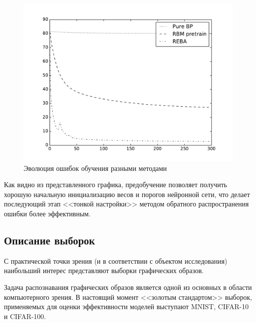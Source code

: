 \begin{figure}[h]
	\begin{center}
		\includegraphics[width=12cm]{man-source/images/ch3/pic3-11.pdf}
		\caption{Эволюция ошибок обучения разными методами}	
		\label{fig:error_evolution}
	\end{center}
\end{figure}

Как видно из представленного графика, предобучение позволяет получить хорошую начальную инициализацию весов и порогов нейронной сети, что делает последующий этап <<тонкой настройки>> методом обратного распространения ошибки более эффективным.

\subsection{Описание выборок}

С практической точки зрения (и в соответствии с объектом исследования) наибольший интерес представляют выборки графических образов.

Задача распознавания графических образов является одной из основных в области компьютерного зрения. В настоящий момент <<золотым стандартом>> выборок, применяемых для оценки эффективности моделей выступают MNIST, CIFAR-10 и CIFAR-100. %

